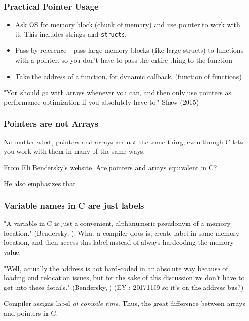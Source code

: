 \documentclass[10pt]{amsart}
\begin{document}
\subsubsection{Practical Pointer Usage}
\begin{itemize}
	\item Ask OS for memory block (chunk of memory) and use pointer to work with it.  This includes strings and \verb|structs|.  
	\item Pass by reference - pass large memory blocks (like large structs) to functions with a pointer, so you don't have to pass the entire thing to the function.  
	\item Take the address of a function, for dynamic callback. (function of functions)
\end{itemize}

"You should go with arrays whenever you can, and then only use pointers as performance optimization if you absolutely have to."  Shaw (2015) \cite{Shaw2015}

\subsubsection{Pointers are not Arrays}  

No matter what, pointers and arrays are not the same thing, even though C lets you work with them in many of the same ways.  

From Eli Bendersky's website, \href{https://eli.thegreenplace.net/2009/10/21/are-pointers-and-arrays-equivalent-in-c}{Are pointers and arrays equivalent in C?}

He also emphasizes that 

\subsubsection{Variable names in C are just labels}  

"A variable in C is just a convenient, alphanumeric pseudonym of a memory location." (Bendersky, \cite{Bend}).  What a compiler does is, create label in some memory location, and then access this label instead of always hardcoding the memory value.   

"Well, actually the address is not hard-coded in an absolute way because of loading and relocation issues, but for the sake of this discussion we don't have to get into these details." (Bendersky, \cite{Bend}) (EY : 20171109 so it's on the address bus?)

Compiler assigns label \emph{at compile time}.  Thus, the great difference between arrays and pointers in C.  
\end{document}
